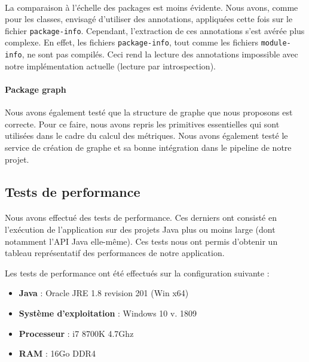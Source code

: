 \documentclass{scrartcl}
\begin{document}
    \paragraph{}La comparaison à l'échelle des packages est moins évidente. Nous avons, comme pour les classes, envisagé d'utiliser des annotations, appliquées cette fois sur le fichier \texttt{package-info}. Cependant, l'extraction de ces annotations s'est avérée plus complexe.
    En effet, les fichiers \texttt{package-info}, tout comme les fichiers \texttt{module-info}, ne sont pas compilés. Ceci rend la lecture des annotations impossible avec notre implémentation actuelle (lecture par introspection).
    
    \paragraph{Package graph}Nous avons également testé que la structure de graphe que nous proposons est correcte. Pour ce faire, nous avons repris les primitives essentielles qui sont utilisées dans le cadre du calcul des métriques. Nous avons également testé le service de création de graphe et sa bonne intégration dans le pipeline de notre projet.
    
\subsection{Tests de performance}

    \paragraph{}Nous avons effectué des tests de performance. Ces derniers ont consisté en l’exécution de l’application sur des projets Java plus ou moins large (dont notamment l'API Java elle-même). Ces tests nous ont permis d’obtenir un tableau représentatif des performances de notre application.
    
    Les tests de performance ont été effectués sur la configuration suivante :
    \begin{itemize}
        \item \textbf{Java} : Oracle JRE 1.8 revision 201 (Win x64)
        \item \textbf{Système d'exploitation} : Windows 10 v. 1809
        \item \textbf{Processeur} : i7 8700K 4.7Ghz
        \item \textbf{RAM} : 16Go DDR4
    \end{itemize}
    
\end{document}
